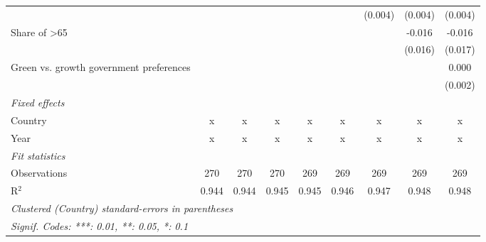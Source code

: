 \begin{table}[htbp]
\begin{tabular}{lcccccccc}
                                                    &         &         &         &         &         & (0.004) & (0.004) & (0.004)\\   
      Share of >65                                  &         &         &         &         &         &         & -0.016  & -0.016\\   
                                                    &         &         &         &         &         &         & (0.016) & (0.017)\\   
      Green vs. growth government preferences       &         &         &         &         &         &         &         & 0.000\\   
                                                    &         &         &         &         &         &         &         & (0.002)\\   
      \emph{Fixed effects}\\
      Country                                       & x       & x       & x       & x       & x       & x       & x       & x\\  
      Year                                          & x       & x       & x       & x       & x       & x       & x       & x\\  
      \midrule \emph{Fit statistics}\\
      Observations                                  & 270     & 270     & 270     & 269     & 269     & 269     & 269     & 269\\  
      R$^2$                                         & 0.944   & 0.944   & 0.945   & 0.945   & 0.946   & 0.947   & 0.948   & 0.948\\  
      \midrule
      \multicolumn{9}{l}{\emph{Clustered (Country) standard-errors in parentheses}}\\
      \multicolumn{9}{l}{\emph{Signif. Codes: ***: 0.01, **: 0.05, *: 0.1}}\\
   \end{tabular}
\end{table}


